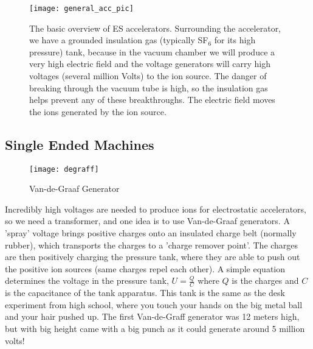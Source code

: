 \begin{figure}
	\centering
	\texttt{[image: general\_acc\_pic]}
	\caption{The basic overview of ES accelerators. Surrounding the accelerator, we have a grounded insulation gas (typically SF$_6$ for its high pressure) tank, because in the vacuum chamber we will produce a very high electric field and the voltage generators will carry high voltages (several million Volts) to the ion source. The danger of breaking through the vacuum tube is high, so the insulation gas helps prevent any of these breakthroughs. The electric field moves the ions generated by the ion source.}
	\label{fig:eagen}
\end{figure}

\subsection{Single Ended Machines}\label{subsec:single-ended-machines}
\begin{wrapfigure}{r}{0.5\linewidth}
	\centering
	\texttt{[image: degraff]}
	\caption{Van-de-Graaf Generator}
	\label{fig:degraff}
\end{wrapfigure}
Incredibly high voltages are needed to produce ions for electrostatic accelerators, so we need a transformer, and one idea is to use Van-de-Graaf generators.
A 'spray' voltage brings positive charges onto an insulated charge belt (normally rubber), which transports the charges to a 'charge remover point'.
The charges are then positively charging the pressure tank, where they are able to push out the positive ion sources (same charges repel each other).
A simple equation determines the voltage in the pressure tank, $U = \frac{Q}{C}$ where $Q$ is the charges and $C$ is the capacitance of the tank apparatus.
This tank is the same as the desk experiment from high school, where you touch your hands on the big metal ball and your hair pushed up.
The first Van-de-Graff generator was 12 meters high, but with big height came with a big punch as it could generate around 5 million volts!

